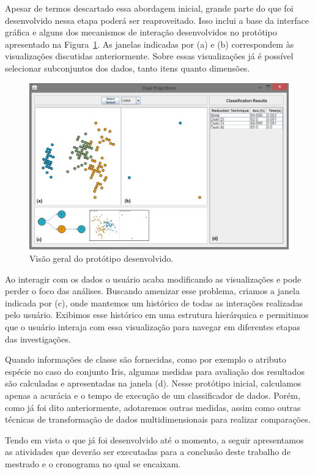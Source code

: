 Apesar de termos descartado essa abordagem inicial, grande
parte do que foi desenvolvido nessa etapa poderá ser
reaproveitado. Isso inclui a base da interface gráfica e
alguns dos mecanismos de interação desenvolvidos no
protótipo apresentado na Figura~\ref{fig:dual-main}. As
janelas indicadas por (a) e (b) correspondem às
visualizações discutidas anteriormente.  Sobre essas
visualizações já é possível selecionar subconjuntos dos
dados, tanto itens quanto dimensões. 

\begin{figure}[h!]
    \centering
    \includegraphics[width=16cm]{images/dual-main.png}
    \caption{Visão geral do protótipo desenvolvido.}
    \label{fig:dual-main}
\end{figure}

Ao interagir com os dados o usuário acaba modificando as
visualizações e pode perder o foco das análises. Buscando
amenizar esse problema, criamos a janela indicada por
(c), onde mantemos um histórico de todas as interações
realizadas pelo usuário. Exibimos esse histórico em uma
estrutura hierárquica e permitimos que o usuário interaja
com essa visualização para navegar em diferentes etapas das
investigações. 

Quando informações de classe são fornecidas, como por
exemplo o atributo espécie no caso do conjunto Iris, algumas
medidas para avaliação dos resultados são calculadas e
apresentadas na janela (d). Nesse protótipo inicial,
calculamos apenas a acurácia e o tempo de execução de um
classificador de dados. Porém, como já foi dito
anteriormente, adotaremos outras medidas, assim como outras
técnicas de transformação de dados multidimensionais para
realizar comparações. 

Tendo em vista o que já foi desenvolvido até o momento, a
seguir apresentamos as atividades que deverão ser executadas
para a conclusão deste trabalho de mestrado e o cronograma
no qual se encaixam.

